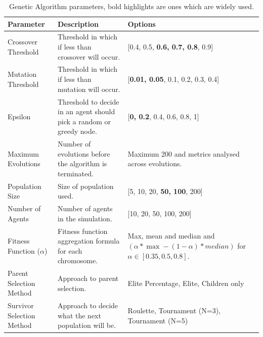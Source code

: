 \documentclass[12pt,a4paper]{report}
\begin{document}
\begin{table}[htb]
  \bigskip
  \begin{center}
    \begin{tabular}{| p{3cm} | p{6.5cm} | p{5cm} |}
      \hline
      Parameter & Description & Options \\
      \hline
      \hline
      Crossover Threshold & Threshold in which if less than crossover will occur. & [0.4, 0.5, \textbf{0.6, 0.7, 0.8}, 0.9]\\

      Mutation Threshold &  Threshold in which if less than mutation will occur. & [\textbf{0.01, 0.05}, 0.1, 0.2, 0.3, 0.4] \\

      Epsilon & Threshold to decide in an agent should pick a random or greedy node. & [\textbf{0, 0.2}, 0.4, 0.6, 0.8, 1] \\

      Maximum Evolutions & Number of evolutions before the algorithm is terminated. & Maximum 200 and metrics analysed across evolutions. \\

      Population Size & Size of population used. & [5, 10, 20, \textbf{50, 100}, 200]\\

      Number of Agents & Number of agents in the simulation. & [10, 20, 50, 100, 200] \\

      Fitness Function ($\alpha$) & Fitness function aggregation formula for each chromosome. & Max, mean and median and $(\alpha * \max - (1-\alpha)*median)$ for $\alpha \in [0.35, 0.5, 0.8]$. \\

      Parent Selection Method & Approach to parent selection. & Elite Percentage, Elite, Children only \\

      Survivor Selection Method & Approach to decide what the next population will be. & Roulette, Tournament (N=3), Tournament (N=5) \\

      \hline
    \end{tabular}
  \end{center}
  \caption[Genetic Algorithm parameters]{Genetic Algorithm parameters, bold highlights are ones which are widely used.}
  \label{table:ga-parameters}
\end{table}
\end{document}
